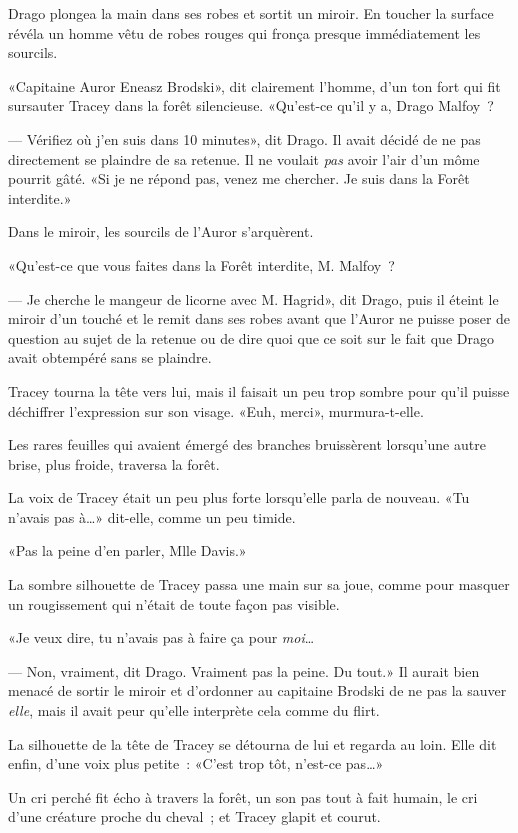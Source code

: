 Drago plongea la main dans ses robes et sortit un miroir. En toucher la surface révéla un homme vêtu de robes rouges qui fronça presque immédiatement les sourcils.

«Capitaine Auror Eneasz Brodski», dit clairement l'homme, d'un ton fort qui fit sursauter Tracey dans la forêt silencieuse. «Qu'est-ce qu'il y a, Drago Malfoy~?

--- Vérifiez où j'en suis dans 10 minutes», dit Drago. Il avait décidé de ne pas directement se plaindre de sa retenue. Il ne voulait \emph{pas} avoir l'air d'un môme pourrit gâté. «Si je ne répond pas, venez me chercher. Je suis dans la Forêt interdite.»

Dans le miroir, les sourcils de l'Auror s'arquèrent.

«Qu'est-ce que vous faites dans la Forêt interdite, M. Malfoy~?

--- Je cherche le mangeur de licorne avec M. Hagrid», dit Drago, puis il éteint le miroir d'un touché et le remit dans ses robes avant que l'Auror ne puisse poser de question au sujet de la retenue ou de dire quoi que ce soit sur le fait que Drago avait obtempéré sans se plaindre.

Tracey tourna la tête vers lui, mais il faisait un peu trop sombre pour qu'il puisse déchiffrer l'expression sur son visage. «Euh, merci», murmura-t-elle.

Les rares feuilles qui avaient émergé des branches bruissèrent lorsqu'une autre brise, plus froide, traversa la forêt.

La voix de Tracey était un peu plus forte lorsqu'elle parla de nouveau. «Tu n'avais pas à…» dit-elle, comme un peu timide.

«Pas la peine d'en parler, Mlle Davis.»

La sombre silhouette de Tracey passa une main sur sa joue, comme pour masquer un rougissement qui n'était de toute façon pas visible.

«Je veux dire, tu n'avais pas à faire ça pour \emph{moi}…

--- Non, vraiment, dit Drago. Vraiment pas la peine. Du tout.» Il aurait bien menacé de sortir le miroir et d'ordonner au capitaine Brodski de ne pas la sauver \emph{elle}, mais il avait peur qu'elle interprète cela comme du flirt.

La silhouette de la tête de Tracey se détourna de lui et regarda au loin. Elle dit enfin, d'une voix plus petite~: «C'est trop tôt, n'est-ce pas…»

Un cri perché fit écho à travers la forêt, un son pas tout à fait humain, le cri d'une créature proche du cheval~; et Tracey glapit et courut.

